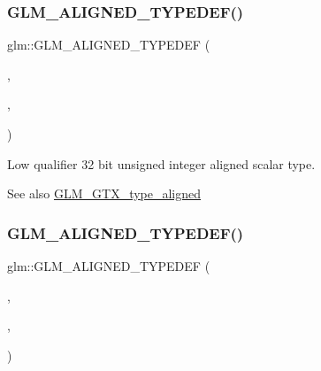 \subsubsection{\texorpdfstring{G\+L\+M\+\_\+\+A\+L\+I\+G\+N\+E\+D\+\_\+\+T\+Y\+P\+E\+D\+E\+F()}{GLM\_ALIGNED\_TYPEDEF()}\hspace{0.1cm}{\footnotesize\ttfamily [75/209]}}
{\footnotesize\ttfamily glm\+::\+G\+L\+M\+\_\+\+A\+L\+I\+G\+N\+E\+D\+\_\+\+T\+Y\+P\+E\+D\+EF (\begin{DoxyParamCaption}\item[{\mbox{\hyperlink{group__gtc__type__precision_ga9f8cb602a358e1f48bda2682cf051f0c}{lowp\+\_\+uint32\+\_\+t}}}]{,  }\item[{aligned\+\_\+lowp\+\_\+uint32\+\_\+t}]{,  }\item[{4}]{ }\end{DoxyParamCaption})}

Low qualifier 32 bit unsigned integer aligned scalar type. \begin{DoxySeeAlso}{See also}
\mbox{\hyperlink{group__gtx__type__aligned}{G\+L\+M\+\_\+\+G\+T\+X\+\_\+type\+\_\+aligned}} 
\end{DoxySeeAlso}
\mbox{\label{group__gtx__type__aligned_gaace64bddf51a9def01498da9a94fb01c}} 
\subsubsection{\texorpdfstring{G\+L\+M\+\_\+\+A\+L\+I\+G\+N\+E\+D\+\_\+\+T\+Y\+P\+E\+D\+E\+F()}{GLM\_ALIGNED\_TYPEDEF()}\hspace{0.1cm}{\footnotesize\ttfamily [76/209]}}
{\footnotesize\ttfamily glm\+::\+G\+L\+M\+\_\+\+A\+L\+I\+G\+N\+E\+D\+\_\+\+T\+Y\+P\+E\+D\+EF (\begin{DoxyParamCaption}\item[{\mbox{\hyperlink{group__gtc__type__precision_gabf3069d4f188557a87b1d7f35eb0a270}{lowp\+\_\+uint64\+\_\+t}}}]{,  }\item[{aligned\+\_\+lowp\+\_\+uint64\+\_\+t}]{,  }\item[{8}]{ }\end{DoxyParamCaption})}

